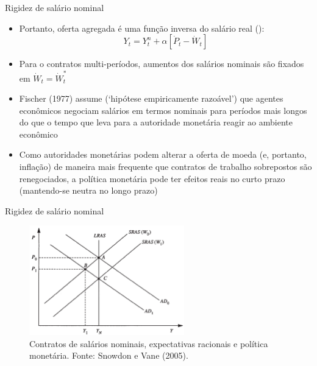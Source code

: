 \documentclass[10pt]{beamer}
\begin{document}
\begin{frame}{Rigidez de salário nominal}
    \begin{itemize}
        \item Portanto, oferta agregada é uma função inversa do salário real ():
        \begin{equation}
            Y_t = Y_t^n + \alpha[\dot{P}_t - \dot{W}_t] 
        \end{equation}
        \item Para o contratos multi-períodos, aumentos dos salários nominais são fixados em $\dot{W}_t = \dot{W}_t^*$\bigskip
        \item Fischer (1977) assume (`hipótese empiricamente razoável') que agentes econômicos negociam salários em termos nominais para períodos mais longos do que o tempo que leva para a autoridade monetária reagir ao ambiente econômico\bigskip
        \item Como autoridades monetárias podem alterar a oferta de moeda (e, portanto, inflação) de maneira mais frequente que contratos de trabalho sobrepostos são renegociados, a política monetária pode ter efeitos reais no curto prazo (mantendo-se neutra no longo prazo)
    \end{itemize}
\end{frame}

\begin{frame}{Rigidez de salário nominal}
    \begin{figure}
        \centering
        \includegraphics[width=0.6\textwidth]{./figures/aula15_fig2.PNG}
        \caption{Contratos de salários nominais, expectativas racionais e política monetária. Fonte: Snowdon e Vane (2005).}
        \label{fig3}
    \end{figure}
\end{frame}
\end{document}
